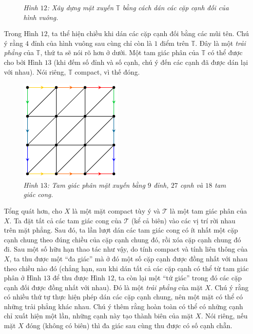 \begin{multicols}{2}
\begin{figure}[H]
		\caption{\small\textit{\color{duongvaotoanhoc}Hình $12$: Xây dựng mặt xuyến $\mathbb{T}$ bằng cách dán các cặp cạnh đối của hình vuông.}}
		\vspace*{-10pt}
	\end{figure}
	Trong Hình $12$, ta thể hiện chiều khi dán các cặp cạnh đối bằng các mũi tên. Chú ý rằng $4$ đỉnh của hình vuông sau cùng chỉ còn là $1$ điểm trên $\mathbb{T}$. Đây là một {\it trải phẳng} của $\mathbb{T}$, thứ ta sẽ nói rõ hơn ở dưới. Một tam giác phân của $\mathbb{T}$ có thể được cho bởi Hình $13$ (khi đếm số đỉnh và số cạnh, chú ý đến các cạnh đã được dán lại với nhau). Nói riêng, $\mathbb{T}$ compact, vì thế đóng.
	\begin{figure}[H]
		\vspace*{-5pt}
		\centering\captionsetup{labelformat=empty, justification=centering}
		\includegraphics[width=0.7\linewidth]{H13.pdf}
		\caption{\small\textit{\color{duongvaotoanhoc}Hình $13$: Tam giác phân mặt xuyến bằng $9$ đỉnh, $27$ cạnh và $18$ tam giác cong.}}
		\vspace*{-10pt}
	\end{figure}
	Tổng quát hơn, cho $X$ là một mặt compact tùy ý và $\mathscr{T}$ là một tam giác phân của $X$. Ta đặt tất cả các tam giác cong của $\mathscr{T}$ (kể cả biên) vào các vị trí rời nhau trên mặt phẳng. Sau đó, ta lần lượt dán các tam giác cong có ít nhất một cặp cạnh chung theo đúng chiều của cặp cạnh chung đó, rồi xóa cặp cạnh chung đó đi. Sau một số hữu hạn thao tác như vậy, do tính compact và tính liên thông của $X$, ta thu được một ``đa giác'' mà ở đó một số cặp cạnh được đồng nhất với nhau theo chiều nào đó (chẳng hạn, sau khi dán tất cả các cặp cạnh có thể từ tam giác phân ở Hình $13$ để thu được Hình $12$, ta còn lại một ``tứ giác'' trong đó các cặp cạnh đối được đồng nhất với nhau). Đó là một {\it trải phẳng} của mặt $X$. Chú ý rằng có nhiều thứ tự thực hiện phép dán các cặp cạnh chung, nên một mặt có thể có những trải phẳng khác nhau. Chú ý thêm rằng hoàn toàn có thể có những cạnh chỉ xuất hiện một lần, những cạnh này tạo thành biên của mặt $X$. Nói riêng, nếu mặt $X$ đóng (không có biên) thì đa giác sau cùng thu được có số cạnh chẵn. 

\end{multicols}
